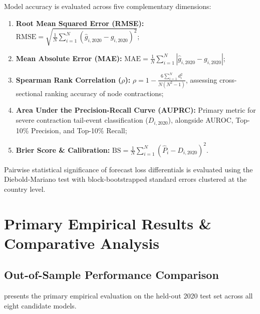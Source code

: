 \documentclass[11pt,a4paper]{article}
\begin{document}
Model accuracy is evaluated across five complementary dimensions:
\begin{enumerate}
    \item \textbf{Root Mean Squared Error (RMSE):} $\text{RMSE} = \sqrt{\frac{1}{N} \sum_{i=1}^N (\hat{g}_{i,2020} - g_{i,2020})^2}$;
    \item \textbf{Mean Absolute Error (MAE):} $\text{MAE} = \frac{1}{N} \sum_{i=1}^N |\hat{g}_{i,2020} - g_{i,2020}|$;
    \item \textbf{Spearman Rank Correlation ($\rho$):} $\rho = 1 - \frac{6 \sum_{i=1}^N d_i^2}{N(N^2 - 1)}$, assessing cross-sectional ranking accuracy of node contractions;
    \item \textbf{Area Under the Precision-Recall Curve (AUPRC):} Primary metric for severe contraction tail-event classification ($D_{i,2020}$), alongside AUROC, Top-10\% Precision, and Top-10\% Recall;
    \item \textbf{Brier Score \& Calibration:} $\text{BS} = \frac{1}{N} \sum_{i=1}^N \left( \hat{P}_i - D_{i,2020} \right)^2$.
\end{enumerate}

Pairwise statistical significance of forecast loss differentials is evaluated using the Diebold-Mariano test \citep{diebold1995comparing} with block-bootstrapped standard errors clustered at the country level.

\section{Primary Empirical Results \& Comparative Analysis}
\label{sec:results}

\subsection{Out-of-Sample Performance Comparison}

 presents the primary empirical evaluation on the held-out 2020 test set across all eight candidate models.
\end{document}
